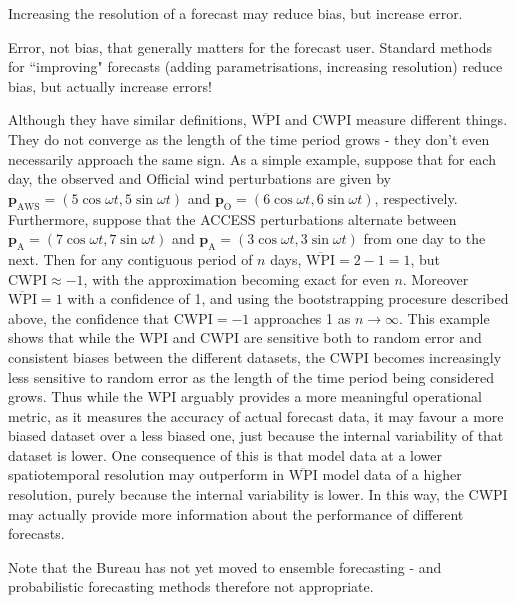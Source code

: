 \documentclass[alpha-refs]{wiley-article}
\begin{document}
Increasing the resolution of a forecast may reduce bias, but increase error.

Error, not bias, that generally matters for the forecast user. Standard methods for ``improving" forecasts (adding parametrisations, increasing resolution) reduce bias, but actually increase errors! 

Although they have similar definitions, $\overline{\text{WPI}}$ and CWPI measure different things. They do not converge as the length of the time period grows - they don't even necessarily approach the same sign. As a simple example, suppose that for each day, the observed and Official wind perturbations are given by $\boldsymbol{p}_{\text{AWS}} = \left(5\cos\omega t , 5\sin\omega t\right)$ and $\boldsymbol{p}_\text{O} = \left(6\cos\omega t , 6\sin\omega t\right)$, respectively. Furthermore, suppose that the ACCESS perturbations alternate between $\boldsymbol{p}_{\text{A}} = \left(7\cos\omega t , 7\sin\omega t\right)$ and $\boldsymbol{p}_{\text{A}} = \left(3\cos\omega t , 3\sin\omega t\right)$ from one day to the next. Then for any contiguous period of $n$ days, $\overline{\text{WPI}} = 2 - 1 = 1$, but $\text{CWPI} \approx -1$, with the approximation becoming exact for even $n$. Moreover $\overline{\text{WPI}}=1$ with a confidence of 1, and using the bootstrapping procesure described above, the confidence that $\text{CWPI} = -1$ approaches 1 as $n\to \infty$. This example shows that while the WPI and CWPI are sensitive both to random error and consistent biases between the different datasets, the CWPI becomes increasingly less sensitive to random error as the length of the time period being considered grows. Thus while the WPI arguably provides a more meaningful operational metric, as it measures the accuracy of actual forecast data, it may favour a more biased dataset over a less biased one, just because the internal variability of that dataset is lower. One consequence of this is that model data at a lower spatiotemporal resolution may outperform in $\overline{\text{WPI}}$ model data of a higher resolution, purely because the internal variability is lower. In this way, the CWPI may actually provide more information about the performance of different forecasts.

Note that the Bureau has not yet moved to ensemble forecasting - and probabilistic forecasting methods therefore not appropriate. 
\end{document}
